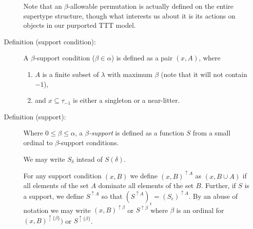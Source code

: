 \documentclass[112pt]{article}
\begin{document}
\begin{description}
Note that an $\beta$-allowable permutation is actually defined on the entire supertype structure, though what interests us about it is its actions on objects in our purported TTT model.






\item[Definition (support condition):]  A $\beta$-support condition ($\beta \in \alpha$) is defined as a pair $(x,A)$, where 
\begin{enumerate}

\item $A$ is a finite subset of $\lambda$  with maximum $\beta$ (note that it will not contain $-1$), 

\item and $x\subseteq \tau_{-1}$ is either a singleton or a near-litter.

\end{enumerate}

\item[Definition (support):]  Where $0\leq\beta \leq \alpha$, a {\em $\beta$-support\/} is defined as a function $S$ from a small ordinal to $\beta$-support conditions.

   We may write $S_\delta$ intead of $S(\delta)$.

For any support condition $(x,B)$ we define $(x,B)^{\uparrow A}$ as $(x,B\cup A)$ if all elements of the set $A$ dominate all elements of the set $B$.
Further, if $S$ is a support, we define $S^{\uparrow A}$ so that $(S^{\uparrow A})_\epsilon = (S_\epsilon)^{\uparrow A}$.  By an abuse of notation we may write $(x,B)^{\uparrow \beta}$ or $S^{\uparrow \beta}$ where $\beta$ is an ordinal for $(x,B)^{\uparrow \{\beta\}})$ or $S^{\uparrow \{\beta\}}$.

\begin{comment}

We make the formal requirement on supports
that if the range of a support contains $(x,A)$ and $(y,A)$ where $x,y$ are typed near-litters and either $(x \Delta y)\cap \tau_{-1}$ or $(x \cap y) \cap \tau_{-1}$ is small, that all $(z,A)$ with $z\cap \tau_{-1}$ a singleton subset of this small set are included in the range of the support.

For any supports $S$ and $T$ we denote by $S+T$ a support which consists
of $S$, followed by $T$, followed by the atoms which need to be added to make this a support (to make it satisfy the additional condition):  what this means is that $(S+T)_\epsilon = S(\epsilon)$ [which we write $S_\epsilon$] for $\epsilon$ in the domain of $S$, $(S+T)_{{\tt dom}(S)+\epsilon} = T_\epsilon$ for $\epsilon$ in the domain of $T$, and the rest of the range of $S+T$ consists of the support conditions with atomic first component  which must be added to satisfy the additional condition [this is not uniquely determined:  supports usually have many possible sums because the needed additional conditions can be added in any order.]
\end{comment}


\end{description}
\end{document}
